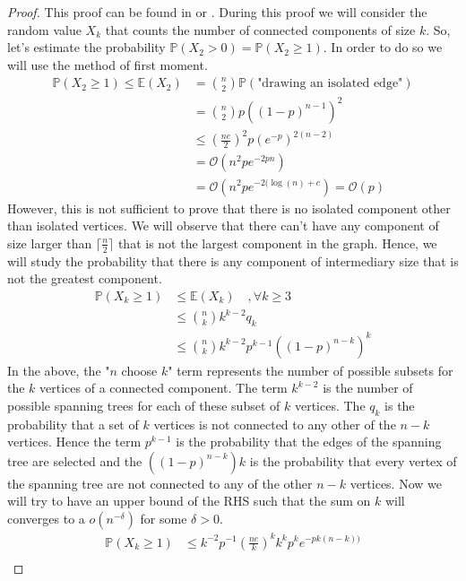\begin{proof}
This proof can be found in \cite{Spencer14} or \cite{Bollob01}.
\newline
During this proof we will consider the random value $X_k$ that counts the number of connected components of size $k$.
So, let's estimate the probability $\mathbb{P}(X_2 > 0) = \mathbb{P}(X_2 \geq 1 )$. In order to do so we will use the method of first moment.
\begin{align}
	\mathbb{P}(X_2 \geq 1) \leq \mathbb{E}(X_2) 	&= \binom{n}{2}\mathbb{P}(\text{"drawing an isolated edge"}) \\
						    	&= \binom{n}{2}p((1-p)^{n-1})^2 \\
							&\leq (\frac{ne}{2})^2p(e^{-p})^{2(n-2)} \\
						    	&= \mathcal{O}\left(n^2p e^{-2pn}\right) \\
							    &= \mathcal{O}(n^2pe^{-2(\log(n) + c}) = \mathcal{O}(p)
\end{align}
However, this is not sufficient to prove that there is no isolated component other than isolated vertices. We will observe that there can't have any component of size larger than $\lceil \frac{n}{2} \rceil$ that is not the largest component in the graph.
Hence, we will study the probability that there is any component of intermediary size that is not the greatest component.
\begin{align}
	\mathbb{P}(X_k \geq 1) &\leq \mathbb{E}(X_k)\quad, \forall k \geq 3 \\
				&\leq \binom{n}{k} k^{k-2} q_k\\
				&\leq \binom{n}{k} k^{k-2} p^{k-1} ((1-p)^{n-k})^k
\end{align}
In the above, the "$n$ choose $k$" term represents the number of possible subsets for the $k$ vertices of a connected component. 
The term $k^{k-2}$ is the number of possible spanning trees for each of these subset of $k$ vertices. 
The $q_k$ is the probability that a set of $k$ vertices is not connected to any other of the $n-k$ vertices.
Hence the term $p^{k-1}$ is the probability that the edges of the spanning tree are selected and the $((1-p)^{n-k})k$ is the probability that every vertex of the spanning tree are not connected to any of the other $n-k$ vertices.
\newline 
Now we will try to have an upper bound of the RHS such that the sum on $k$ will converges to a $o(n^{-\delta})$ for some $\delta >0$.
\begin{align}
	\mathbb{P}(X_k \geq 1) 	
	            &\leq k^{-2}p^{-1}(\frac{ne}{k})^k k^{k} p^{k} e^{-pk(n-k))}\\

\end{align}
\end{proof}

